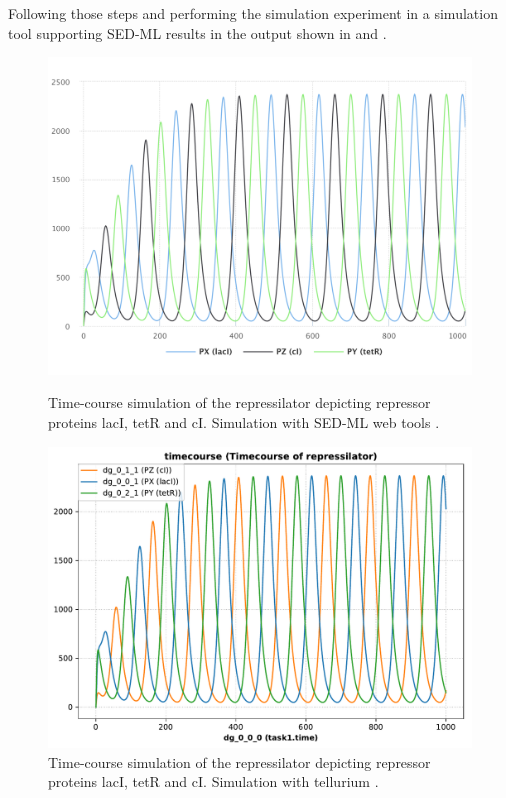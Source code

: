 Following those steps and performing the simulation experiment in a simulation tool supporting SED-ML results in the output shown in  and .

\begin{figure}[ht]
    \centering
    \begin{minipage}{0.47\textwidth}
        \centering
        \includegraphics[width=1.0\textwidth]{examples/repressilator/results/sedml_webtools/timecourse}
        \caption{Time-course simulation of the repressilator depicting repressor proteins lacI, tetR and cI. Simulation with SED-ML web tools \citep{bergmann2017sed}.}
        \label{fig:rep_tc1}
    \end{minipage}\hfill
    \begin{minipage}{0.47\textwidth}
        \centering
        \includegraphics[width=1.0\textwidth]{examples/repressilator/results/tellurium/timecourse}
        \caption{Time-course simulation of the repressilator depicting repressor proteins lacI, tetR and cI. Simulation with tellurium \citep{tellurium}.}
        \label{fig:rep_tc2}
    \end{minipage}
\end{figure}


